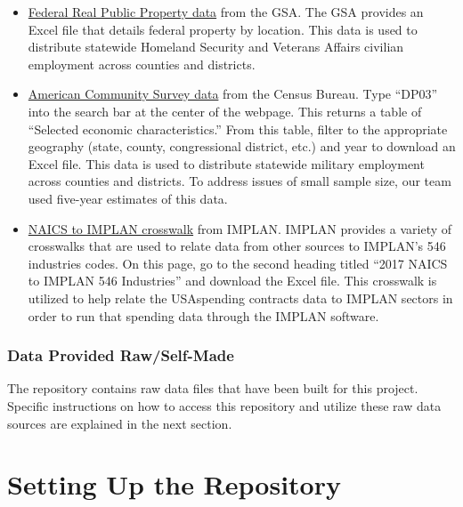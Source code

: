 \documentclass[
]{book}
\begin{document}
\begin{itemize}
\item
  \href{https://www.gsa.gov/policy-regulations/policy/real-property-policy/asset-management/federal-real-property-profile-frpp/federal-real-property-public-data-set}{Federal Real Public Property data} from the GSA. The GSA provides an Excel file that details federal property by location. This data is used to distribute statewide Homeland Security and Veterans Affairs civilian employment across counties and districts.
\item
  \href{https://data.census.gov/cedsci/}{American Community Survey data} from the Census Bureau. Type ``DP03'' into the search bar at the center of the webpage. This returns a table of ``Selected economic characteristics.'' From this table, filter to the appropriate geography (state, county, congressional district, etc.) and year to download an Excel file. This data is used to distribute statewide military employment across counties and districts. To address issues of small sample size, our team used five-year estimates of this data.
\item
  \href{https://support.implan.com/hc/en-us/articles/360034896614-546-Industries-Conversions-Bridges-Construction-2018-Data}{NAICS to IMPLAN crosswalk} from IMPLAN. IMPLAN provides a variety of crosswalks that are used to relate data from other sources to IMPLAN's 546 industries codes. On this page, go to the second heading titled ``2017 NAICS to IMPLAN 546 Industries'' and download the Excel file. This crosswalk is utilized to help relate the USAspending contracts data to IMPLAN sectors in order to run that spending data through the IMPLAN software.
\end{itemize}

\hypertarget{provided}{%
\subsection{Data Provided Raw/Self-Made}\label{provided}}

The repository contains raw data files that have been built for this project. Specific instructions on how to access this repository and utilize these raw data sources are explained in the next section.

\hypertarget{setup}{%
\chapter{Setting Up the Repository}\label{setup}}
\end{document}
